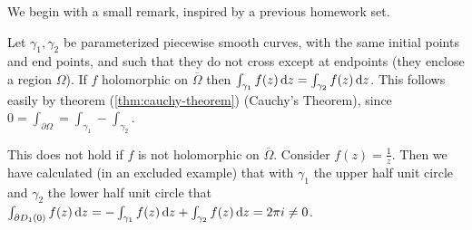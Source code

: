 \setcounter{section}{0}
\setcounter{theorem}{0}


We begin with a small remark, inspired by a previous homework set.

\begin{remark}
Let $\gamma_1, \gamma_2$ be parameterized piecewise smooth curves, with the same initial points and end points, and such that they do not cross except at endpoints (they enclose a region $\Omega$). If $f$ holomorphic on $\overline{\Omega}$ then $\int_{\gamma_1}f(z) \dif z = \int_{\gamma_2} f(z) \dif z$. This follows easily by theorem (\ref{thm:cauchy-theorem}) (Cauchy's Theorem), since $0 = \int_{\partial \Omega} = \int_{\gamma_1} - \int_{\gamma_2}$.

\begin{center}
\end{center}


This does not hold if $f$ is not holomorphic on $\overline{\Omega}$. Consider $f(z)= \frac{1}{z}$. Then we have calculated (in an excluded example) that with $\gamma_1$ the upper half unit circle and $\gamma_2$ the lower half unit circle that $\int_{\partial D_1(0)} f(z) \dif z = - \int_{\gamma_1} f(z) \dif z + \int_{\gamma_2} f(z) \dif z = 2\pi i \neq 0$.
\end{remark}




